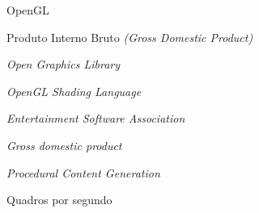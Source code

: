 \documentclass[tg]{mdtuffs}
\begin{document}

\listoffigures

\listoftables



\begin{listofabbrv}{OpenGL}
    \item [GDP] Produto Interno Bruto \textit{(Gross Domestic Product)}
    \item [OpenGL] \textit{Open Graphics Library}
    \item [GLSL] \textit{OpenGL Shading Language}
    \item [ESA] \textit{Entertainment Software Association}
    \item [GDP] \textit{Gross domestic product}
    \item [PCG] \textit{Procedural Content Generation}
    \item [fps] Quadros por segundo
    
\end{listofabbrv}
\end{document}
